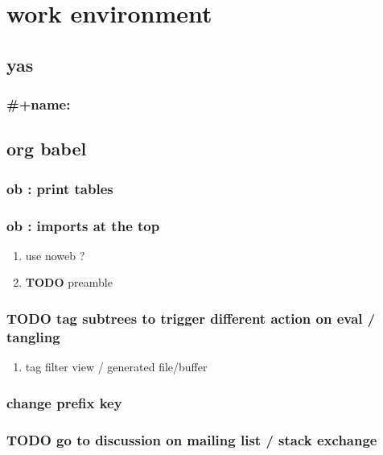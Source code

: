 \documentclass[11pt]{article}
\author{teddd}
\date{\today}
\title{}
\begin{document}
\tableofcontents

\section{work environment}
\label{sec:org5c6ddb7}
\subsection{yas}
\label{sec:orgcf23ccc}
\subsubsection{\#+name:}
\label{sec:org430f6fa}
\subsection{org babel}
\label{sec:orgb46666e}
\subsubsection{ob : print tables}
\label{sec:orgd9c8cc0}
\subsubsection{ob : imports at the top}
\label{sec:org76bacae}
\begin{enumerate}
\item use noweb ?
\label{sec:orgb6a8974}
\item {\bfseries\sffamily TODO} preamble
\label{sec:org12dc924}
\end{enumerate}
\subsubsection{{\bfseries\sffamily TODO} tag subtrees to trigger different action on eval / tangling}
\label{sec:org7e09477}
\begin{enumerate}
\item tag filter view / generated file/buffer
\label{sec:org216a72d}
\end{enumerate}
\subsubsection{change prefix key}
\label{sec:org62bfde6}
\subsubsection{{\bfseries\sffamily TODO} go to discussion on mailing list / stack exchange}
\label{sec:org348f4ff}
\end{document}
